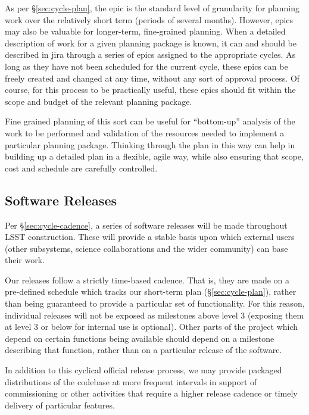 As per \S\ref{sec:cycle-plan}, the \gls{epic} is the standard level of granularity for planning work over the relatively short term (periods of several months).
However, \glspl{epic} may also be valuable for longer-term, fine-grained planning.
When a detailed description of work for a given planning package is known, it can and should be described in \gls{jira} through a series of \glspl{epic} assigned to the appropriate \glspl{cycle}.
As long as they have not been scheduled for the current \gls{cycle}, these \glspl{epic} can be freely created and changed at any time, without any sort of approval process.
Of course, for this process to be practically useful, these \glspl{epic} should fit within the scope and budget of the relevant planning package.

Fine grained planning of this sort can be useful for ``bottom-up''
analysis of the work to be performed and validation of the resources
needed to implement a particular planning package. Thinking through the
plan in this way can help in building up a detailed plan in a flexible,
agile way, while also ensuring that scope, cost and schedule are
carefully controlled.

\subsection{Software Releases}\label{software-releases}

Per \S\ref{sec:cycle-cadence}, a series of software releases will be made
throughout LSST construction. These will provide a stable basis upon
which external users (other subsystems, science collaborations and the
wider community) can base their work.

Our releases follow a strictly time-based cadence. That is, they are
made on a pre-defined schedule which tracks our
short-term plan (\S\ref{sec:cycle-plan}), rather than
being guaranteed to provide a particular set of functionality. For this
reason, individual releases will not be exposed as milestones above
level 3 (exposing them at level 3 or below for internal use is
optional). Other parts of the project which depend on certain functions
being available should depend on a milestone describing that function,
rather than on a particular release of the software.

In addition to this cyclical official release process, we may provide
packaged distributions of the codebase at more frequent intervals in
support of commissioning or other activities that require a higher
release cadence or timely delivery of particular features.

